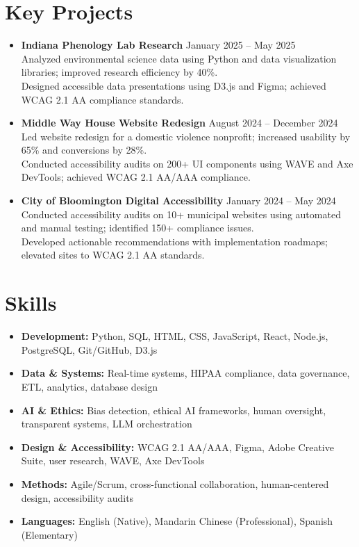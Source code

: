 \documentclass[11pt]{article}
\begin{document}
\section*{Key Projects}
\begin{itemize}[leftmargin=*]
    \item \textbf{Indiana Phenology Lab Research} \hfill January 2025 -- May 2025\\
    Analyzed environmental science data using Python and data visualization libraries; improved research efficiency by 40\%.\\
    Designed accessible data presentations using D3.js and Figma; achieved WCAG 2.1 AA compliance standards.

    \item \textbf{Middle Way House Website Redesign} \hfill August 2024 -- December 2024\\
    Led website redesign for a domestic violence nonprofit; increased usability by 65\% and conversions by 28\%.\\
    Conducted accessibility audits on 200+ UI components using WAVE and Axe DevTools; achieved WCAG 2.1 AA/AAA compliance.

    \item \textbf{City of Bloomington Digital Accessibility} \hfill January 2024 -- May 2024\\
    Conducted accessibility audits on 10+ municipal websites using automated and manual testing; identified 150+ compliance issues.\\
    Developed actionable recommendations with implementation roadmaps; elevated sites to WCAG 2.1 AA standards.
\end{itemize}

\section*{Skills}
\begin{itemize}[leftmargin=*]
    \item \textbf{Development:} Python, SQL, HTML, CSS, JavaScript, React, Node.js, PostgreSQL, Git/GitHub, D3.js
    \item \textbf{Data \& Systems:} Real-time systems, HIPAA compliance, data governance, ETL, analytics, database design
    \item \textbf{AI \& Ethics:} Bias detection, ethical AI frameworks, human oversight, transparent systems, LLM orchestration
    \item \textbf{Design \& Accessibility:} WCAG 2.1 AA/AAA, Figma, Adobe Creative Suite, user research, WAVE, Axe DevTools
    \item \textbf{Methods:} Agile/Scrum, cross-functional collaboration, human-centered design, accessibility audits
    \item \textbf{Languages:} English (Native), Mandarin Chinese (Professional), Spanish (Elementary)
\end{itemize}
\end{document}
